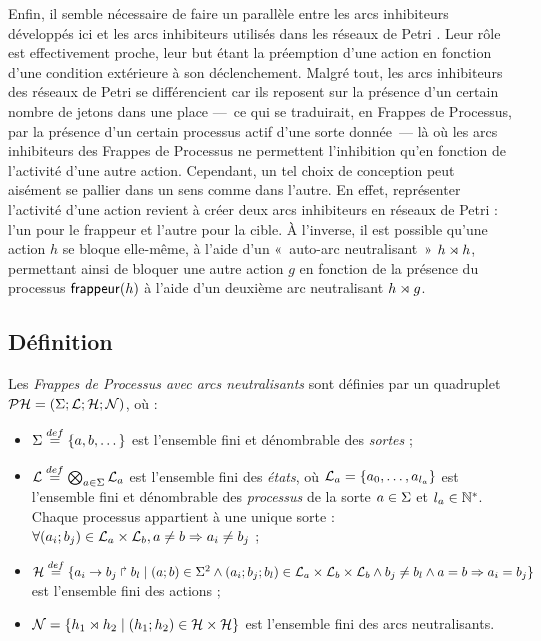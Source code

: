 Enfin, il semble nécessaire de faire un parallèle entre les arcs inhibiteurs développés ici
et les arcs inhibiteurs utilisés dans les réseaux de Petri \cite{Peterson77petrinets}.
Leur rôle est effectivement proche, leur but étant la préemption d'une action en fonction
d'une condition extérieure à son déclenchement.
Malgré tout, les arcs inhibiteurs des réseaux de Petri se différencient car ils
reposent sur la présence d'un certain nombre de jetons dans une place
---~ce qui se traduirait, en Frappes de Processus,
par la présence d'un certain processus actif d'une sorte donnée~---
là où les arcs inhibiteurs des Frappes de Processus ne permettent l'inhibition
qu'en fonction de l'activité d'une autre action.
Cependant, un tel choix de conception peut aisément se pallier dans un sens comme dans l'autre.
En effet, représenter l'activité d'une action revient à créer deux arcs inhibiteurs en
réseaux de Petri : l'un pour le frappeur et l'autre pour la cible.
À l'inverse, il est possible qu'une action $h$ se bloque elle-même, à l'aide d'un 
«~auto-arc neutralisant~» $h\rtimes h$,
permettant ainsi de bloquer une autre action $g$
en fonction de la présence du processus $\mathsf{frappeur}(h)$
à l'aide d'un deuxième arc neutralisant $h\rtimes g$.

\subsection{Définition}

\begin{definition}
  Les \emph{Frappes de Processus avec arcs neutralisants} sont définies par
  un quadruplet $\mathcal{PH} = (\Sigma ; \mathcal{L} ; \mathcal{H} ; \mathcal{N})$, où :
  \begin{itemize}
    \item $\Sigma \stackrel{def}= \{a, b, \dots\}$ est l'ensemble fini et dénombrable des \emph{sortes} ;
    \item $\mathcal{L} \stackrel{def}= \bigotimes_{a \in \Sigma} \mathcal{L}_a$ est l'ensemble fini des \emph{états},
      où $\mathcal{L}_a = \{a_0, \ldots, a_{l_a}\}$ est l'ensemble fini et dénombrable
      des \emph{processus} de la sorte $a \in \Sigma$ et $l_a \in \mathbb{N}^*$.
      Chaque processus appartient à une unique sorte :
      $\forall (a_i; b_j) \in \mathcal{L}_a \times \mathcal{L}_b, a \neq b \Rightarrow a_i \neq b_j$ ;
    \item $\mathcal{H} \stackrel{def}= \{a_i\rightarrow b_j\Rsh b_l \mid (a; b) \in \Sigma^2 \wedge
      (a_i; b_j; b_l) \in \mathcal{L}_a \times \mathcal{L}_b \times \mathcal{L}_b \wedge
      b_j \neq b_l \wedge a = b \Rightarrow a_i = b_j \}$ est l'ensemble fini des actions ;
    \item $\mathcal{N} = \{h_1\rtimes h_2 \mid (h_1 ; h_2) \in \mathcal{H} \times \mathcal{H}\}$
      est l'ensemble fini des arcs neutralisants.
  \end{itemize}
\end{definition}

